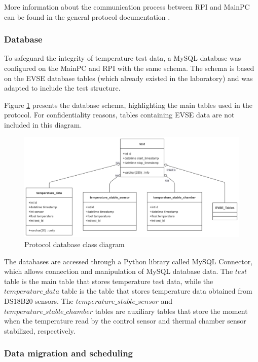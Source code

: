 More information about the communication process between RPI and MainPC can be found in the general protocol documentation \cite{Documentation_drive_folder}.

\subsubsection{Database}

To safeguard the integrity of temperature test data, a MySQL database was configured on the MainPC and RPI with the same schema. 
The schema is based on the EVSE database tables (which already existed in the laboratory) and was adapted to include the test structure. 

Figure \ref{fig:class_diagram} presents the database schema, highlighting the main tables used in the protocol. For confidentiality reasons, tables containing EVSE data are not included in this diagram.

\begin{figure}[H]
    \centering
    \includegraphics[width=\textwidth]{figures/class_diagram.png}
    \caption{Protocol database class diagram}
    \label{fig:class_diagram}
\end{figure}


The databases are accessed through a Python library called MySQL Connector, which allows connection and manipulation of MySQL database data. The $test$ table is the main table that stores temperature test data, while the $\mathit{temperature\_data}$ table is the table that stores temperature data obtained from DS18B20 sensors. The $\mathit{temperature\_stable\_sensor}$ and $\mathit{temperature\_stable\_chamber}$ tables are auxiliary tables that store the moment when the temperature read by the control sensor and thermal chamber sensor stabilized, respectively.

\subsubsection{Data migration and scheduling}

